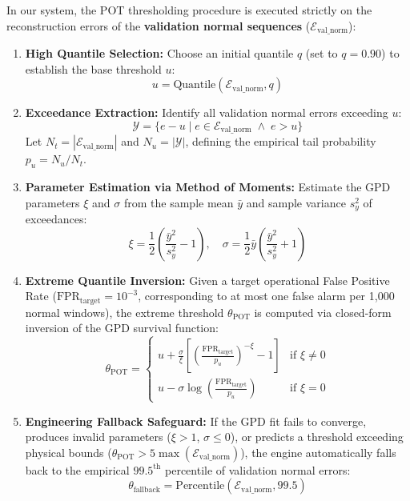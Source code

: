 In our system, the POT thresholding procedure is executed strictly on the reconstruction errors of the \textbf{validation normal sequences} ($\mathcal{E}_{\text{val\_norm}}$):
\begin{enumerate}
    \item \textbf{High Quantile Selection:} Choose an initial quantile $q$ (set to $q=0.90$) to establish the base threshold $u$:
    \begin{equation}
        u = \text{Quantile}(\mathcal{E}_{\text{val\_norm}}, q)
    \end{equation}
    \item \textbf{Exceedance Extraction:} Identify all validation normal errors exceeding $u$:
    \begin{equation}
        \mathcal{Y} = \{ e - u \mid e \in \mathcal{E}_{\text{val\_norm}} \;\land\; e > u \}
    \end{equation}
    Let $N_t = |\mathcal{E}_{\text{val\_norm}}|$ and $N_u = |\mathcal{Y}|$, defining the empirical tail probability $p_u = N_u / N_t$.
    \item \textbf{Parameter Estimation via Method of Moments:} Estimate the GPD parameters $\xi$ and $\sigma$ from the sample mean $\bar{y}$ and sample variance $s_y^2$ of exceedances:
    \begin{equation}
        \xi = \frac{1}{2} \left( \frac{\bar{y}^2}{s_y^2} - 1 \right), \quad \sigma = \frac{1}{2} \bar{y} \left( \frac{\bar{y}^2}{s_y^2} + 1 \right)
    \end{equation}
    \item \textbf{Extreme Quantile Inversion:} Given a target operational False Positive Rate ($\text{FPR}_{\text{target}} = 10^{-3}$, corresponding to at most one false alarm per 1,000 normal windows), the extreme threshold $\theta_{\text{POT}}$ is computed via closed-form inversion of the GPD survival function:
    \begin{equation}
        \theta_{\text{POT}} = \begin{cases}
            u + \frac{\sigma}{\xi} \left[ \left( \frac{\text{FPR}_{\text{target}}}{p_u} \right)^{-\xi} - 1 \right] & \text{if } \xi \ne 0 \\
            u - \sigma \log\left( \frac{\text{FPR}_{\text{target}}}{p_u} \right) & \text{if } \xi = 0
        \end{cases}
    \end{equation}
    \item \textbf{Engineering Fallback Safeguard:} If the GPD fit fails to converge, produces invalid parameters ($\xi > 1$, $\sigma \le 0$), or predicts a threshold exceeding physical bounds ($\theta_{\text{POT}} > 5 \max(\mathcal{E}_{\text{val\_norm}})$), the engine automatically falls back to the empirical $99.5^{\text{th}}$ percentile of validation normal errors:
    \begin{equation}
        \theta_{\text{fallback}} = \text{Percentile}(\mathcal{E}_{\text{val\_norm}}, 99.5)
    \end{equation}
\end{enumerate}

